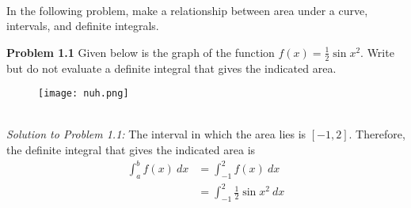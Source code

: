 \documentclass[11pt]{scrartcl}
\begin{document}
\\
\noindent 
In the following problem, make a relationship between area under a curve, intervals, and definite integrals. 
\newpage
\begin{tcolorbox}[colback=purple!5!white,colframe=purple!75!black]
\textbf{Problem 1.1} Given below is the graph of the function $f(x)=\frac{1}{2} \sin x^2$. Write but do not evaluate a definite integral that gives the indicated area. 
\end{tcolorbox}
\noindent 
\begin{figure}[htp]
    \centering
    \texttt{[image: nuh.png]}
\end{figure}\\
\noindent
\textit{Solution to Problem 1.1:} The interval in which the area lies is $[-1,2]$. Therefore, the definite integral that gives the indicated area is 
\begin{align*}
\int_a^b f(x) \ dx &= \int_{-1}^2 f(x) \ dx \\
                   &=\int_{-1}^2 \frac{1}{2} \sin x^2 \ dx
\end{align*}
\end{document}

